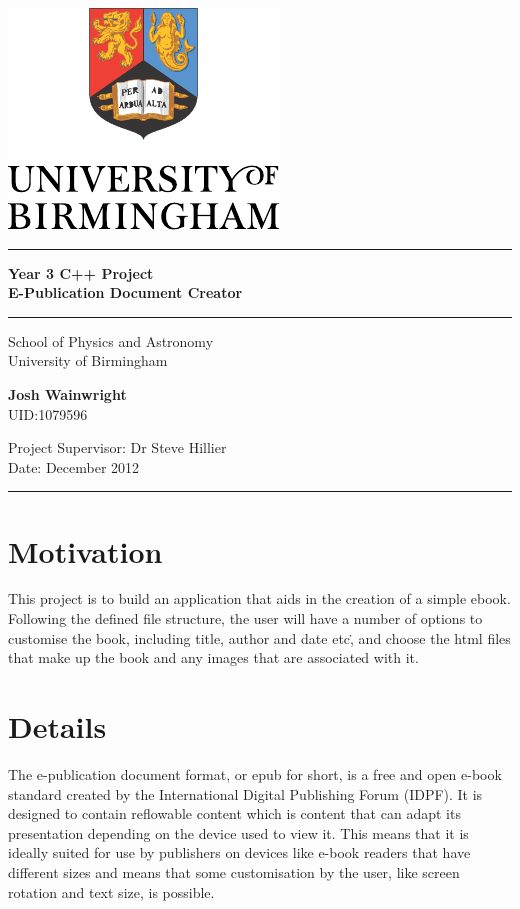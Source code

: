 \documentclass[11pt]{article} %
\begin{document}
  \begin{center}
    \vspace*{\fill}

    \centering
    \includegraphics[scale=1.0]{Logo.pdf}
    \vfill

    \hrule
    {\LARGE\bf Year 3 C++ Project\\ E-Publication Document Creator \\[0.6cm]}
    \hrule 

    \vfill
    \large
    School of Physics and Astronomy\\
    University of Birmingham

    \vfill
    {\bf Josh Wainwright\\}
    UID:1079596
    \vfill

    \vfill
    Project Supervisor: Dr Steve Hillier\\
    Date: December 2012
    \vfill
    
    \vfill

  \end{center}

\newpage

\tableofcontents
\vspace{1cm}\hrule \vspace{1cm}
\section{Motivation}
This project is to build an application that aids in the creation of a simple ebook. Following the defined file structure, the user will have a number of options to customise the book, including title, author and date etc\., and choose the html files that make up the book and any images that are associated with it.

\section{Details}
The e-publication document format, or epub for short, is a free and open e-book standard created by the International Digital Publishing Forum (IDPF). It is designed to contain reflowable content which is content that can adapt its presentation depending on the device used to view it. This means that it is ideally suited for use by publishers on devices like e-book readers that have different sizes and means that some customisation by the user, like screen rotation and text size, is possible.
\end{document}
